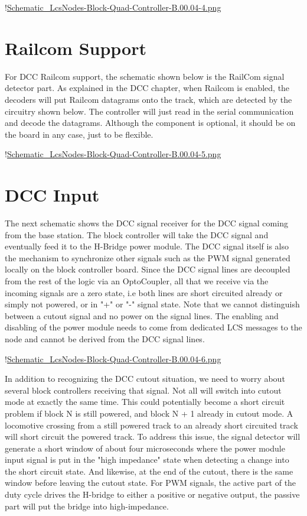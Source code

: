 !\href{./Schematics/Schematic_LcsNodes-Block-Quad-Controller-B.00.04-4.png }{Schematic_LcsNodes-Block-Quad-Controller-B.00.04-4.png}

\section{Railcom Support}

For DCC Railcom support, the schematic shown below is the RailCom signal detector part. As explained in the DCC chapter, when Railcom is enabled, the decoders will put Railcom datagrams onto the track, which are detected by the circuitry shown below. The controller will just read in the serial communication and decode the datagrams. Although the component is optional, it should be on the board in any case, just to be flexible.

!\href{./Schematics/Schematic_LcsNodes-Block-Quad-Controller-B.00.04-5.png }{Schematic_LcsNodes-Block-Quad-Controller-B.00.04-5.png}

\section{DCC Input}

The next schematic shows the DCC signal receiver for the DCC signal coming from the base station. The block controller will take the DCC signal and eventually feed it to the H-Bridge power module. The DCC signal itself is also the mechanism to synchronize other signals such as the PWM signal generated locally on the block controller board. Since the DCC signal lines are decoupled from the rest of the logic via an OptoCoupler, all that we receive via the incoming signals are a zero state, i.e both lines are short circuited already or simply not powered, or in "+" or "-" signal state. Note that we cannot distinguish between a cutout signal and no power on the signal lines. The enabling and disabling of the power module needs to come from dedicated LCS messages to the node and cannot be derived from the DCC signal lines.

!\href{./Schematics/Schematic_LcsNodes-Block-Quad-Controller-B.00.04-6.png }{Schematic_LcsNodes-Block-Quad-Controller-B.00.04-6.png}

In addition to recognizing the DCC cutout situation, we need to worry about several block controllers receiving that signal. Not all will switch into cutout mode at exactly the same time. This could potentially become a short circuit problem if block N is still powered, and block N + 1 already in cutout mode. A locomotive crossing from a still powered track to an already short circuited track will short circuit the powered track. To address this issue, the signal detector will generate a short window of about four microseconds where the power module input signal is put in the "high impedance" state when detecting a change into the short circuit state. And likewise, at the end of the cutout, there is the same window before leaving the cutout state. For PWM signals, the active part of the duty cycle drives the H-bridge to either a positive or negative output, the passive part will put the bridge into high-impedance.

